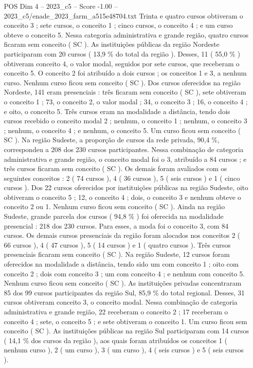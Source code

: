 \begin{textsample}{POS Dim 4 – 2023\_c5 – Score -1.00 – 2023\_c5/enade\_2023\_farm\_a515e48704.txt}
Trinta e quatro cursos obtiveram o conceito 3 ; sete cursos, o conceito 1 ; cinco cursos, o conceito 4 ; e um curso obteve o conceito 5.
Nessa categoria administrativa e grande região, quatro cursos ficaram sem conceito ( SC ).
As instituições públicas da região Nordeste participaram com 20 cursos ( 13,9 \% do total da região ).
Desses, 11 ( 55,0 \% ) obtiveram conceito 4, o valor modal, seguidos por sete cursos, que receberam o conceito 5.
O conceito 2 foi atribuído a dois cursos ; os conceitos 1 e 3, a nenhum curso.
Nenhum curso ficou sem conceito ( SC ).
Dos cursos oferecidos na região Nordeste, 141 eram presenciais : três ficaram sem conceito ( SC ), sete obtiveram o conceito 1 ; 73, o conceito 2, o valor modal ; 34, o conceito 3 ; 16, o conceito 4 ; e oito, o conceito 5.
Três cursos eram na modalidade a distância, tendo dois cursos recebido o conceito modal 2 ; nenhum, o conceito 1 ; nenhum, o conceito 3 ; nenhum, o conceito 4 ; e nenhum, o conceito 5.
Um curso ficou sem conceito ( SC ).
Na região Sudeste, a proporção de cursos da rede privada, 90,4 \%, correspondeu a 208 dos 230 cursos participantes.
Nessa combinação de categoria administrativa e grande região, o conceito modal foi o 3, atribuído a 84 cursos ; e três cursos ficaram sem conceito ( SC ).
Os demais foram avaliados com os seguintes conceitos : 2 ( 74 cursos ), 4 ( 36 cursos ), 5 ( seis cursos ) e 1 ( cinco cursos ).
Dos 22 cursos oferecidos por instituições públicas na região Sudeste, oito obtiveram o conceito 5 ; 12, o conceito 4 ; dois, o conceito 3 e nenhum obteve o conceito 2 ou 1.
Nenhum curso ficou sem conceito ( SC ).
Ainda na região Sudeste, grande parcela dos cursos ( 94,8 \% ) foi oferecida na modalidade presencial : 218 dos 230 cursos.
Para esses, a moda foi o conceito 3, com 84 cursos.
Os demais cursos presenciais da região foram alocados nos conceitos 2 ( 66 cursos ), 4 ( 47 cursos ), 5 ( 14 cursos ) e 1 ( quatro cursos ).
Três cursos presenciais ficaram sem conceito ( SC ).
Na região Sudeste, 12 cursos foram oferecidos na modalidade a distância, tendo sido um com conceito 1 ; oito com conceito 2 ; dois com conceito 3 ; um com conceito 4 ; e nenhum com conceito 5.
Nenhum curso ficou sem conceito ( SC ).
As instituições privadas concentraram 85 dos 99 cursos participantes da região Sul, 85,9 \% do total regional.
Desses, 31 cursos obtiveram conceito 3, o conceito modal.
Nessa combinação de categoria administrativa e grande região, 22 receberam o conceito 2 ; 17 receberam o conceito 4 ; sete, o conceito 5 ; e sete obtiveram o conceito 1.
Um curso ficou sem conceito ( SC ).
As instituições públicas na região Sul participaram com 14 cursos ( 14,1 \% dos cursos da região ), aos quais foram atribuídos os conceitos 1 ( nenhum curso ), 2 ( um curso ), 3 ( um curso ), 4 ( seis cursos ) e 5 ( seis cursos ).

\end{textsample}
